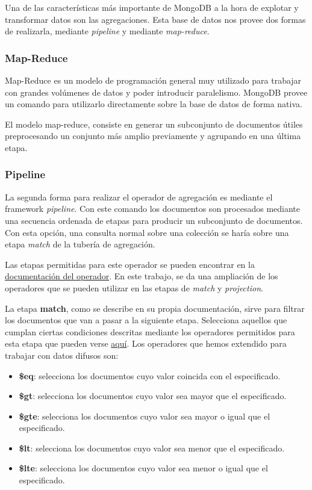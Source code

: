 Una de las características más importante de MongoDB a la hora de explotar y transformar datos son las agregaciones. Esta base de datos nos provee dos formas de realizarla, mediante \textit{pipeline}    y mediante \textit{map-reduce}.

\subsubsection{Map-Reduce}\label{mapreduce}

Map-Reduce es un modelo de programación general muy utilizado para trabajar con grandes volúmenes de datos y poder introducir paralelismo. MongoDB provee un comando para utilizarlo directamente sobre la base de datos de forma nativa.

El modelo map-reduce, consiste en generar un subconjunto de documentos útiles preprocesando un conjunto más amplio previamente y agrupando en una última etapa.

\subsubsection{Pipeline}\label{pipeline}

La segunda forma para realizar el operador de agregación es mediante el framework \textit{pipeline}. Con este comando los documentos son procesados mediante una secuencia ordenada de etapas para producir un subconjunto de documentos. Con esta opción, una consulta normal sobre una colección se haría sobre una etapa \textit{match} de la tubería de agregación.

Las etapas permitidas para este operador se pueden encontrar en la \href{https://docs.mongodb.com/manual/reference/operator/aggregation-pipeline/}{documentación del operador}. En este trabajo, se da una ampliación de los operadores que se pueden utilizar en las etapas de \textit{match} y \textit{projection}.

La etapa \textbf{match}, como se describe en su propia documentación, sirve para filtrar los documentos que van a pasar a la siguiente etapa. Selecciona aquellos que cumplan ciertas condiciones descritas mediante los operadores permitidos para esta etapa que pueden verse \href{https://docs.mongodb.com/manual/reference/operator/query/}{aquí}. Los operadores que hemos extendido para trabajar con datos difusos son:

\begin{itemize}
    \item \textbf{\$eq}: selecciona los documentos cuyo valor coincida con el especificado.
    \item \textbf{\$gt}: selecciona los documentos cuyo valor sea mayor que el especificado.
    \item \textbf{\$gte}: selecciona los documentos cuyo valor sea mayor o igual que el especificado.
    \item \textbf{\$lt}: selecciona los documentos cuyo valor sea menor que el especificado.
    \item \textbf{\$lte}: selecciona los documentos cuyo valor sea menor o igual que el especificado.
\end{itemize}

